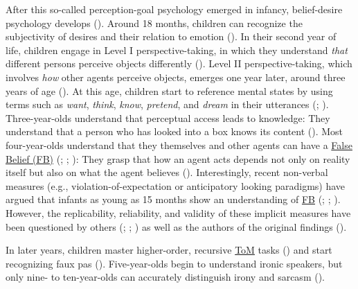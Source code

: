 \documentclass[
]{scrbook}
\begin{document}
After this so-called perception-goal psychology emerged in infancy, belief-desire psychology develops (). Around 18 months, children can recognize the subjectivity of desires and their relation to emotion (). In their second year of life, children engage in Level I perspective-taking, in which they understand \emph{that} different persons perceive objects differently (). Level II perspective-taking, which involves \emph{how} other agents perceive objects, emerges one year later, around three years of age (). At this age, children start to reference mental states by using terms such as \emph{want}, \emph{think}, \emph{know}, \emph{pretend}, and \emph{dream} in their utterances (; ). Three-year-olds understand that perceptual access leads to knowledge: They understand that a person who has looked into a box knows its content (). Most four-year-olds understand that they themselves and other agents can have a \hyperref[acronyms_FB]{False Belief (FB)} (; ; ): They grasp that how an agent acts depends not only on reality itself but also on what the agent believes (). Interestingly, recent non-verbal measures (e.g., violation-of-expectation or anticipatory looking paradigms) have argued that infants as young as 15 months show an understanding of \hyperref[acronyms_FB]{FB} (; ; ). However, the replicability, reliability, and validity of these implicit measures have been questioned by others (; ; ) as well as the authors of the original findings ().

In later years, children master higher-order, recursive \hyperref[acronyms_ToM]{ToM} tasks () and start recognizing faux pas (). Five-year-olds begin to understand ironic speakers, but only nine- to ten-year-olds can accurately distinguish irony and sarcasm ().
\end{document}
